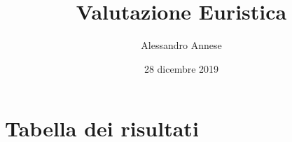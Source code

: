 \documentclass[french]{article}
\title{Valutazione Euristica}
\author{Alessandro Annese}
\date{28 dicembre 2019}
\begin{document}
\maketitle

\section{Tabella dei risultati}




\end{document}
